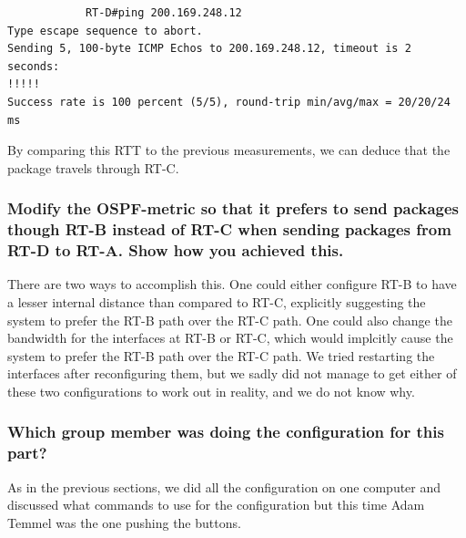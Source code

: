 \documentclass[a4paper, titlepage,12pt]{article}
\begin{document}
		\begin{verbatim}
			RT-D#ping 200.169.248.12
Type escape sequence to abort.
Sending 5, 100-byte ICMP Echos to 200.169.248.12, timeout is 2 seconds:
!!!!!
Success rate is 100 percent (5/5), round-trip min/avg/max = 20/20/24 ms
		\end{verbatim}

		By comparing this RTT to the previous measurements, we can deduce that the package travels through RT-C.

		\subsubsection{Modify the OSPF-metric so that it prefers to send packages though RT-B instead of RT-C when sending packages from RT-D to RT-A. Show how you achieved this.}

		There are two ways to accomplish this. One could either configure RT-B to have a lesser internal distance than compared to RT-C, explicitly suggesting the system to prefer the RT-B path over the RT-C path. One could also change the bandwidth for the interfaces at RT-B or RT-C, which would implcitly cause the system to prefer the RT-B path over the RT-C path. We tried restarting the interfaces after reconfiguring them, but we sadly did not manage to get either of these two configurations to work out in reality, and we do not know why.

		\subsubsection{Which group member was doing the configuration for this part?}

		As in the previous sections, we did all the configuration on one computer and discussed what commands to use for the configuration but this time Adam Temmel was the one pushing the buttons.
\end{document}
